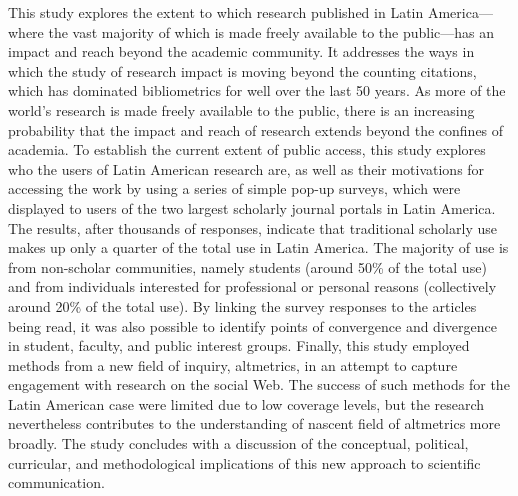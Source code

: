 This study explores the extent to which research published in Latin America—where the vast majority of which is made freely available to the public—has an impact and reach beyond the academic community. It addresses the ways in which the study of research impact is moving beyond the counting citations, which has dominated bibliometrics for well over the last 50 years. As more of the world's research is made freely available to the public, there is an increasing probability that the impact and reach of research extends beyond the confines of academia. To establish the current extent of public access, this study explores who the users of Latin American research are, as well as their motivations for accessing the work by using a series of simple pop-up surveys, which were displayed to users of the two largest scholarly journal portals in Latin America. The results, after thousands of responses, indicate that traditional scholarly use makes up only a quarter of the total use in Latin America. The majority of use is from non-scholar communities, namely students (around 50\% of the total use) and from individuals interested for professional or personal reasons (collectively around 20\% of the total use). By linking the survey responses to the articles being read, it was also possible to identify points of convergence and divergence in student, faculty, and public interest groups. Finally, this study employed methods from a new field of inquiry, altmetrics, in an attempt to capture engagement with research on the social Web. The success of such methods for the Latin American case were limited due to low coverage levels, but the research nevertheless contributes to the understanding of nascent field of altmetrics more broadly. The study concludes with a discussion of the conceptual, political, curricular, and methodological implications of this new approach to scientific communication.